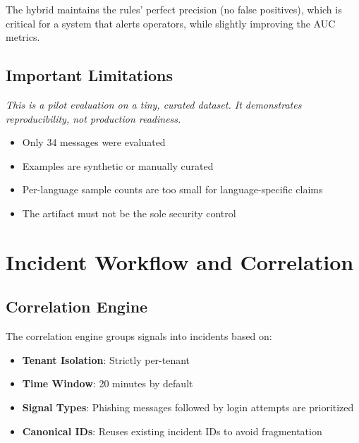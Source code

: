 \documentclass[12pt,a4paper,twoside]{report}
\begin{document}
The hybrid maintains the rules' perfect precision (no false positives), which is critical for a system that alerts operators, while slightly improving the AUC metrics.

\section{Important Limitations}
\textit{This is a pilot evaluation on a tiny, curated dataset. It demonstrates reproducibility, not production readiness.}
\begin{itemize}[noitemsep]
    \item Only 34 messages were evaluated
    \item Examples are synthetic or manually curated
    \item Per-language sample counts are too small for language-specific claims
    \item The artifact must not be the sole security control
\end{itemize}

\clearpage

\chapter{Incident Workflow and Correlation}
\label{chap:incidents}

\section{Correlation Engine}
The correlation engine groups signals into incidents based on:
\begin{itemize}[noitemsep]
    \item \textbf{Tenant Isolation}: Strictly per-tenant
    \item \textbf{Time Window}: 20 minutes by default
    \item \textbf{Signal Types}: Phishing messages followed by login attempts are prioritized
    \item \textbf{Canonical IDs}: Reuses existing incident IDs to avoid fragmentation
\end{itemize}
\end{document}
